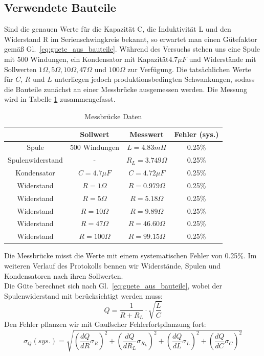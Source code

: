 \documentclass[12pt,a4paper]{article}
\begin{document}
\subsection{Verwendete Bauteile}
Sind die genauen Werte für die Kapazität C, die Induktivität L und den Widerstand R im Serienschwingkreis bekannt, so erwartet man einen Gütefaktor gemäß Gl.~\eqref{eq:guete_aus_bauteile}. Während des Versuchs stehen uns eine Spule mit 500 Windungen, ein Kondensator mit Kapazität$4.7\mu F$ und Widerstände mit Sollwerten $1\Omega,5\Omega,10\Omega,47\Omega$ und $100\Omega$ zur Verfügung. Die tatsächlichen Werte für $C$, $R$ und $L$ unterliegen jedoch produktionsbedingten Schwankungen, sodass die Bauteile zunächst an einer Messbrücke ausgemessen werden. Die Messung wird in Tabelle \ref{table:Messbruecke} zusammengefasst.
\begin{table}[H]
	\centering
	\begin{tabular}{|c|c|c|c|}
		\hline
		&Sollwert&Messwert&Fehler (sys.)\\
		\hline
		Spule&500 Windungen&$L=4.83mH$&0.25\%\\
		Spulenwiderstand&-&$R_L=3.749\Omega$&0.25\%\\
		Kondensator&$C=4.7\mu F$&$C=4.72\mu F$&0.25\%\\
		Widerstand&$R=1\Omega$&$R=0.979\Omega$&0.25\%\\
		Widerstand&$R=5\Omega$&$R=5.18\Omega$&0.25\%\\		
		Widerstand&$R=10\Omega$&$R=9.89\Omega$&0.25\%\\		
		Widerstand&$R=47\Omega$&$R=46.60\Omega$&0.25\%\\
		Widerstand&$R=100\Omega$&$R=99.15\Omega$&0.25\%\\
		\hline
	\end{tabular}
	\caption{Messbrücke Daten}
	\label{table:Messbruecke}
\end{table}
Die Messbrücke misst die Werte mit einem systematischen Fehler von 0.25\%. Im weiteren Verlauf des Protokolls bennen wir Widerstände, Spulen und Kondensatoren nach ihren Sollwerten.\\
Die Güte berechnet sich nach Gl.~\eqref{eq:guete_aus_bauteile}, wobei der Spulenwiderstand mit berücksichtigt werden muss:
\begin{equation}
Q=\frac{1}{R+R_L}\cdot \sqrt{\frac{L}{C}}
\end{equation}
Den Fehler pflanzen wir mit Gaußscher Fehlerfortpflanzung fort:
\begin{equation}
\sigma_Q(sys.)=\sqrt{\left(\frac{dQ}{dR}\sigma_R\right)^2+\left(\frac{dQ}{dR_L}\sigma_{R_L}\right)^2+\left(\frac{dQ}{dL}\sigma_L\right)^2+\left(\frac{dQ}{dC}\sigma_C\right)^2}
\end{equation}
\end{document}
